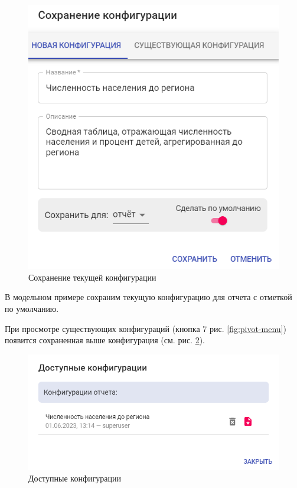 \documentclass[../user-manual.tex]{subfiles}
\begin{document}
	\begin{figure}[h]
		\centering
		\includegraphics[width=\graphicswidth]{img/26-save-pivot.png}
		\caption{Сохранение текущей конфигурации}
		\label{fig:save-pivot}
	\end{figure}	
	
	
	\begin{modelExample}
		
		В модельном примере сохраним текущую конфигурацию для отчета с отметкой по умолчанию.
		
		При просмотре существующих конфигураций (кнопка 7 рис. \ref{fig:pivot-menu}) появится сохраненная выше конфигурация (см. рис. \ref{fig:config-list}). 
				
	\end{modelExample}

	\begin{figure}[h]
		\centering
		\includegraphics[width=\graphicswidth]{img/27-config-list.png}
		\caption{Доступные конфигурации}
		\label{fig:config-list}
	\end{figure}	
		
\end{document}
